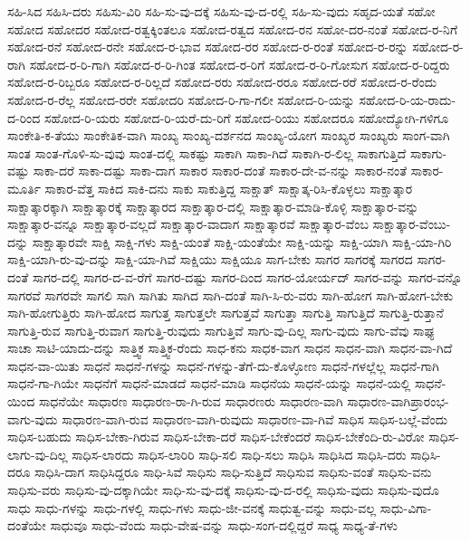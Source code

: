 {ಸಹಿ-ಸಿದ
ಸಹಿಸಿ-ದರು
ಸಹಿಸು-ವಿರಿ
ಸಹಿ-ಸು-ವು-ದಕ್ಕೆ
ಸಹಿಸು-ವು-ದ-ರಲ್ಲಿ
ಸಹಿ-ಸು-ವುದು
ಸಹೃದ-ಯತೆ
ಸಹೋ
ಸಹೋದ
ಸಹೋದರ
ಸಹೋದ-ರತ್ವಕ್ಕಿಂತಲೂ
ಸಹೋದ-ರತ್ವದ
ಸಹೋದ-ರನ
ಸಹೋ-ದರ-ನಂತೆ
ಸಹೋದ-ರ-ನಿಗೆ
ಸಹೋದ-ರನೆ
ಸಹೋದ-ರನೇ
ಸಹೋದ-ರ-ಭಾವ
ಸಹೋದ-ರರ
ಸಹೋದ-ರ-ರಂತೆ
ಸಹೋದ-ರ-ರನ್ನು
ಸಹೋದ-ರ-ರಾಗಿ
ಸಹೋದ-ರ-ರಿ-ಗಾಗಿ
ಸಹೋದ-ರ-ರಿ-ಗಿಂತ
ಸಹೋದ-ರ-ರಿಗೆ
ಸಹೋದ-ರ-ರಿ-ಗೋಸುಗ
ಸಹೋದ-ರ-ರಿದ್ದರು
ಸಹೋದ-ರ-ರಿಬ್ಬರೂ
ಸಹೋದ-ರ-ರಿಲ್ಲದೆ
ಸಹೋದ-ರರು
ಸಹೋದ-ರರೂ
ಸಹೋದ-ರರೆ
ಸಹೋದ-ರ-ರೆಂದು
ಸಹೋದ-ರ-ರೆಲ್ಲ
ಸಹೋದ-ರರೇ
ಸಹೋದರಿ
ಸಹೋದ-ರಿ-ಗಾ-ಗಲೀ
ಸಹೋದ-ರಿ-ಯನ್ನು
ಸಹೋದ-ರಿ-ಯ-ರಾದು-ದ-ರಿಂದ
ಸಹೋದ-ರಿ-ಯರು
ಸಹೋದ-ರಿ-ಯರೆ-ದು-ರಿಗೆ
ಸಹೋದ-ರಿಯು
ಸಹೋದರೂ
ಸಹೋದ್ಯೋಗಿ-ಗಳಿಗೂ
ಸಾಂಕೇತಿ-ಕ-ತೆಯು
ಸಾಂಕೇತಿಕ-ವಾಗಿ
ಸಾಂಖ್ಯ
ಸಾಂಖ್ಯ-ದರ್ಶನದ
ಸಾಂಖ್ಯ-ಯೋಗ
ಸಾಂಖ್ಯರ
ಸಾಂಖ್ಯರು
ಸಾಂಗ-ವಾಗಿ
ಸಾಂತ
ಸಾಂತ-ಗೊಳಿ-ಸು-ವುವು
ಸಾಂತ-ದಲ್ಲಿ
ಸಾಕಷ್ಟು
ಸಾಕಾಗಿ
ಸಾಕಾ-ಗಿದೆ
ಸಾಕಾಗಿ-ರ-ಲಿಲ್ಲ
ಸಾಕಾಗುತ್ತಿದೆ
ಸಾಕಾಗು-ವಷ್ಟು
ಸಾಕಾ-ದರೆ
ಸಾಕಾ-ದಷ್ಟು
ಸಾಕಾ-ದಾಗ
ಸಾಕಾರ
ಸಾಕಾರ-ದಂತೆ
ಸಾಕಾರ-ದೇ-ವ-ನನ್ನು
ಸಾಕಾರ-ನಂತೆ
ಸಾಕಾರ-ಮೂರ್ತಿ
ಸಾಕಾರ-ವೆತ್ತ
ಸಾಕಿದ
ಸಾಕಿ-ದನು
ಸಾಕು
ಸಾಕುತ್ತಿದ್ದ
ಸಾಕ್ಷಾತ್
ಸಾಕ್ಷಾತ್ಕ-ರಿಸಿ-ಕೊಳ್ಳಲು
ಸಾಕ್ಷಾತ್ಕಾರ
ಸಾಕ್ಷಾತ್ಕಾರಕ್ಕಾಗಿ
ಸಾಕ್ಷಾತ್ಕಾರಕ್ಕೆ
ಸಾಕ್ಷಾತ್ಕಾರದ
ಸಾಕ್ಷಾತ್ಕಾರ-ದಲ್ಲಿ
ಸಾಕ್ಷಾತ್ಕಾರ-ಮಾಡಿ-ಕೊಳ್ಳಿ
ಸಾಕ್ಷಾತ್ಕಾರ-ವನ್ನು
ಸಾಕ್ಷಾತ್ಕಾರ-ವನ್ನೂ
ಸಾಕ್ಷಾತ್ಕಾರ-ವಲ್ಲದೆ
ಸಾಕ್ಷಾತ್ಕಾರ-ವಾದಾಗ
ಸಾಕ್ಷಾತ್ಕಾರವೆ
ಸಾಕ್ಷಾತ್ಕಾರ-ವೆಂಬ
ಸಾಕ್ಷಾತ್ಕಾರ-ವೆಂಬು-ದನ್ನು
ಸಾಕ್ಷಾತ್ಕಾರವೇ
ಸಾಕ್ಷಿ
ಸಾಕ್ಷಿ-ಗಳು
ಸಾಕ್ಷಿ-ಯಂತೆ
ಸಾಕ್ಷಿ-ಯಂತೆಯೇ
ಸಾಕ್ಷಿ-ಯನ್ನು
ಸಾಕ್ಷಿ-ಯಾಗಿ
ಸಾಕ್ಷಿ-ಯಾ-ಗಿರಿ
ಸಾಕ್ಷಿ-ಯಾಗಿ-ರು-ವು-ದನ್ನು
ಸಾಕ್ಷಿ-ಯಾ-ಗಿವೆ
ಸಾಕ್ಷಿಯು
ಸಾಕ್ಷಿಯೂ
ಸಾಗ-ಬೇಕು
ಸಾಗರ
ಸಾಗರಕ್ಕೆ
ಸಾಗರದ
ಸಾಗರ-ದಂತೆ
ಸಾಗರ-ದಲ್ಲಿ
ಸಾಗರ-ದ-ವ-ರೆಗೆ
ಸಾಗರ-ದಷ್ಟು
ಸಾಗರ-ದಿಂದ
ಸಾಗರ-ಯೋರ್ಯದ್
ಸಾಗರ-ವನ್ನು
ಸಾಗರ-ವನ್ನೊ
ಸಾಗರವೆ
ಸಾಗರವೇ
ಸಾಗಲಿ
ಸಾಗಿ
ಸಾಗಿತು
ಸಾಗಿದ
ಸಾಗಿ-ದಂತೆ
ಸಾಗಿ-ಸಿ-ರು-ವರು
ಸಾಗಿ-ಹೋಗ
ಸಾಗಿ-ಹೋಗ-ಬೇಕು
ಸಾಗಿ-ಹೋಗುತ್ತಿರು
ಸಾಗಿ-ಹೋದ
ಸಾಗುತ್ತ
ಸಾಗುತ್ತಲೇ
ಸಾಗುತ್ತವೆ
ಸಾಗುತ್ತಾ
ಸಾಗುತ್ತಿ
ಸಾಗುತ್ತಿದೆ
ಸಾಗುತ್ತಿ-ರುತ್ತಾನೆ
ಸಾಗುತ್ತಿ-ರುವ
ಸಾಗುತ್ತಿ-ರುವಾಗ
ಸಾಗುತ್ತಿ-ರುವುದು
ಸಾಗುತ್ತಿವೆ
ಸಾಗು-ವು-ದಿಲ್ಲ
ಸಾಗು-ವುದು
ಸಾಗು-ವೆವು
ಸಾಘ್ಯ
ಸಾಚಾ
ಸಾಟಿ-ಯಾದು-ದನ್ನು
ಸಾತ್ತ್ವಿಕ
ಸಾತ್ತ್ವಿಕ-ರೆಂದು
ಸಾಧ-ಕನು
ಸಾಧಕ-ವಾಗ
ಸಾಧನ
ಸಾಧನ-ವಾಗಿ
ಸಾಧನ-ವಾ-ಗಿದೆ
ಸಾಧನ-ವಾ-ಯಿತು
ಸಾಧನೆ
ಸಾಧನೆ-ಗಳನ್ನು
ಸಾಧನೆ-ಗಳನ್ನು-ತೆಗೆ-ದು-ಕೊಳ್ಳೋಣ
ಸಾಧನೆ-ಗಳಲ್ಲೆಲ್ಲ
ಸಾಧನೆ-ಗಾಗಿ
ಸಾಧನೆ-ಗಾ-ಗಿಯೇ
ಸಾಧನೆಗೆ
ಸಾಧನೆ-ಮಾಡದೆ
ಸಾಧನೆ-ಮಾಡಿ
ಸಾಧನೆಯ
ಸಾಧನೆ-ಯನ್ನು
ಸಾಧನೆ-ಯಲ್ಲಿ
ಸಾಧನೆ-ಯಿಂದ
ಸಾಧನೆಯೇ
ಸಾಧಾರಣ
ಸಾಧಾರಣ-ರಾ-ಗಿ-ರುವ
ಸಾಧಾರಣರು
ಸಾಧಾರಣ-ವಾಗಿ
ಸಾಧಾರಣ-ವಾಗಿಪ್ರಾರಂಭ-ವಾಗು-ವುದು
ಸಾಧಾರಣ-ವಾಗಿ-ರುವ
ಸಾಧಾರಣ-ವಾಗಿ-ರುವುದು
ಸಾಧಾರಣ-ವಾ-ಗಿವೆ
ಸಾಧಿಸ
ಸಾಧಿಸ-ಬಲ್ಲೆ-ವೆಂದು
ಸಾಧಿಸ-ಬಹುದು
ಸಾಧಿಸ-ಬೇಕಾ-ಗಿರುವ
ಸಾಧಿಸ-ಬೇಕಾ-ದರೆ
ಸಾಧಿಸ-ಬೇಕೆಂದರೆ
ಸಾಧಿಸ-ಬೇಕೆಂದಿ-ರು-ವಿರೋ
ಸಾಧಿಸ-ಲಾಗು-ವು-ದಿಲ್ಲ
ಸಾಧಿಸ-ಲಾರದು
ಸಾಧಿಸ-ಲಾರಿರಿ
ಸಾಧಿ-ಸಲಿ
ಸಾಧಿ-ಸಲು
ಸಾಧಿಸಿ
ಸಾಧಿಸಿದ
ಸಾಧಿಸಿ-ದರು
ಸಾಧಿಸಿ-ದರೂ
ಸಾಧಿಸಿ-ದಾಗ
ಸಾಧಿಸಿದ್ದರೂ
ಸಾಧಿ-ಸಿವೆ
ಸಾಧಿಸು
ಸಾಧಿ-ಸುತ್ತಿದೆ
ಸಾಧಿಸುವ
ಸಾಧಿಸು-ವಂತೆ
ಸಾಧಿಸು-ವನು
ಸಾಧಿಸು-ವರು
ಸಾಧಿಸು-ವು-ದಕ್ಕಾಗಿಯೇ
ಸಾಧಿ-ಸು-ವು-ದಕ್ಕೆ
ಸಾಧಿಸು-ವು-ದ-ರಲ್ಲಿ
ಸಾಧಿಸು-ವುದು
ಸಾಧಿಸು-ವುದೊ
ಸಾಧು
ಸಾಧು-ಗಳನ್ನು
ಸಾಧು-ಗಳಲ್ಲಿ
ಸಾಧು-ಗಳು
ಸಾಧು-ಜೀ-ವನಕ್ಕೆ
ಸಾಧುತ್ವ-ವನ್ನು
ಸಾಧು-ವಲ್ಲ
ಸಾಧು-ವಿಗಾ-ದಂತೆಯೇ
ಸಾಧುವೂ
ಸಾಧು-ವೆಂದು
ಸಾಧು-ವೇಷ-ವನ್ನು
ಸಾಧು-ಸಂಗ-ದಲ್ಲಿದ್ದರೆ
ಸಾಧ್ಯ
ಸಾಧ್ಯ-ತೆ-ಗಳು
}

